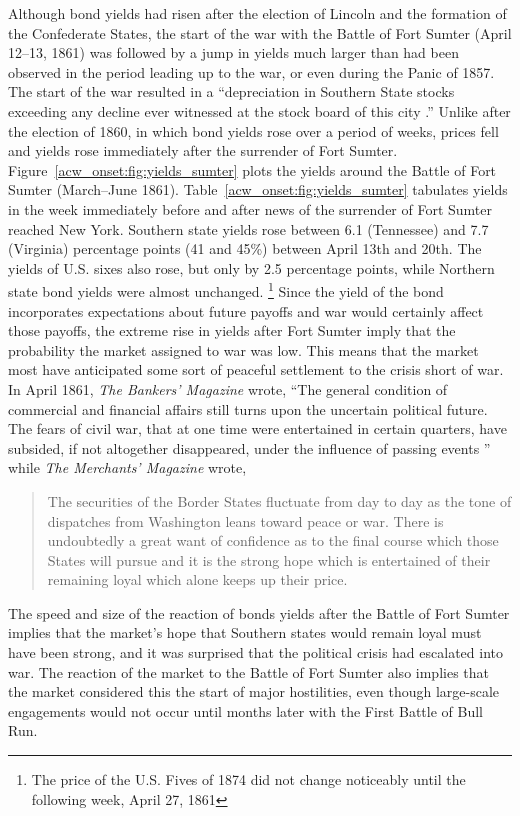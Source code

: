 Although bond yields had risen after the election of Lincoln and the formation of the Confederate States, the start of the war with the Battle of Fort Sumter (April 12--13, 1861) was followed by a jump in yields much larger than had been observed in the period leading up to the war, or even during the Panic of 1857.
The start of the war resulted in a ``depreciation in Southern State stocks exceeding any decline ever witnessed at the stock board of this city \parencite[919]{BankersMagazine1860}.''
Unlike after the election of 1860, in which bond yields rose over a period of weeks, prices fell and yields rose immediately after the surrender of Fort Sumter.
Figure~\ref{acw_onset:fig:yields_sumter} plots the yields around the Battle of Fort Sumter (March--June 1861).
Table~\ref{acw_onset:fig:yields_sumter} tabulates yields in the week immediately before and after news of the surrender of Fort Sumter reached New York.
Southern state yields rose between 6.1 (Tennessee) and 7.7 (Virginia) percentage points (41 and 45\%) between April 13th and 20th.
The yields of U.S. sixes also rose, but only by 2.5 percentage points,
while Northern state bond yields were almost unchanged.%
\footnote{The price of the U.S. Fives of 1874 did not change noticeably until the following week, April 27, 1861}
Since the yield of the bond incorporates expectations about future payoffs and war would certainly affect those payoffs, the extreme rise in yields after Fort Sumter imply that the probability the market assigned to war was low.
This means that the market most have anticipated some sort of peaceful settlement to the crisis short of war.
In April 1861, \textit{The Bankers' Magazine} wrote, ``The general condition of commercial and financial affairs still turns upon the uncertain political future. The fears of civil war, that at one time were entertained in certain quarters, have subsided, if not altogether disappeared, under the influence of passing events \parencite[413]{HomansDana1861a}''
while \textit{The Merchants' Magazine} wrote,
\begin{quotation}
  The securities of the Border States fluctuate from day to day as the tone of dispatches from Washington leans toward peace or war.
  There is undoubtedly a great want of confidence as to the final course which those States will pursue and it is the strong hope which is entertained of their remaining loyal which alone keeps up their price. \parencite[838]{BankersMagazine1860}
\end{quotation}
The speed and size of the reaction of bonds yields after the Battle of Fort Sumter implies that the market's hope that Southern states would remain loyal must have been strong, and it was surprised that the political crisis had escalated into war.
The reaction of the market to the Battle of Fort Sumter also implies that the market considered this the start of major hostilities, even though large-scale engagements would not occur until months later with the First Battle of Bull Run.


